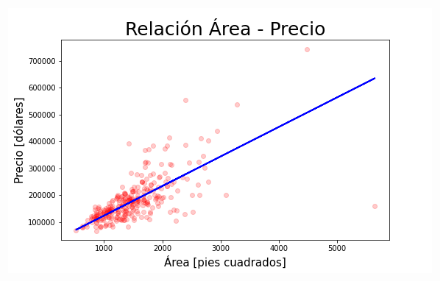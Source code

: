 \documentclass{article}
\begin{document}
\begin{figure}[h!]
\includegraphics[scale=0.5]{Imagenes/recta_final.png}
\centering
\end{figure}
\newpage
\end{document}
